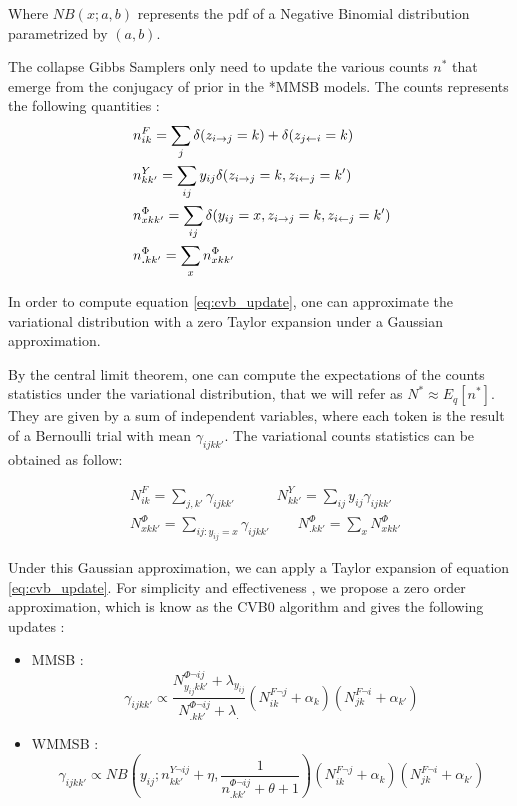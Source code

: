 Where $NB(x;a, b)$ represents the pdf of a Negative Binomial distribution parametrized by $(a,b)$.

The collapse Gibbs Samplers only need to update the various counts $n^*$ that emerge from the conjugacy of prior in the *MMSB models. The counts represents the following quantities :
\begin{align}
&n^{F}_{ik} = \sum_j \delta(\zij=k) + \delta(z_{j\leftarrow i}=k) \\  
&n^{Y}_{kk'} = \sum_{ij} y_{ij}\delta(\zij=k, \zji=k') \\
&n^{\Phi}_{xkk'} = \sum_{ij} \delta(y_{ij}=x, \zij=k, \zji=k') \\
&n^{\Phi}_{\bm{.}kk'} = \sum_x n^{\Phi}_{xkk'}
\end{align}

In order to compute equation \eqref{eq:cvb_update}, one can approximate the variational distribution with a zero Taylor expansion under a Gaussian approximation. 

By the central limit theorem, one can compute the expectations of the counts statistics under the variational distribution, that we will refer as $N^* \approx E_q[n^*]$. They are given by a sum of independent variables, where each token is the result of a Bernoulli trial with mean $\gamma_{ijkk'}$. The variational counts statistics can be obtained as follow:

\begin{align} \label{eq:stat_cvb}
    &N^{F}_{ik} = \sum_{j, k'} \gamma_{ijkk'} \qquad\quad  N^{Y}_{kk'} = \sum_{ij} y_{ij}\gamma_{ijkk'} \\
    &N^{\Phi}_{xkk'} = \sum_{ij:y_{ij}=x} \gamma_{ijkk'} \qquad  N^{\Phi}_{\bm{.}kk'} = \sum_x N^{\Phi}_{xkk'}
\end{align}

Under this Gaussian approximation, we can apply a Taylor expansion of equation \eqref{eq:cvb_update}. For simplicity and effectiveness \cite{asuncion2009smoothing}, we propose a zero order approximation, which is know as the CVB0 algorithm and gives the following updates :

\begin{itemize}
    \item MMSB : \[ \gamma_{ijkk'} \propto  \frac{ N^{\Phi\neg ij}_{y_{ij}kk'} + \lambda_{y_{ij}}}{N^{\Phi\neg ij}_{\bm{.}kk'} + \lambda_{\bm{.}}} (N^{F\neg j}_{ik} + \alpha_k) (N^{F\neg i}_{jk} + \alpha_{k'})\]
    \item WMMSB : \[ \gamma_{ijkk'} \propto NB(y_{ij}; n^{Y\neg ij}_{kk'} + \eta, \frac{1}{n^{\Phi\neg ij}_{\bm{.}kk'} + \theta + 1} ) (N^{F\neg j}_{ik} + \alpha_k) (N^{F\neg i}_{jk} + \alpha_{k'})\]
\end{itemize}

